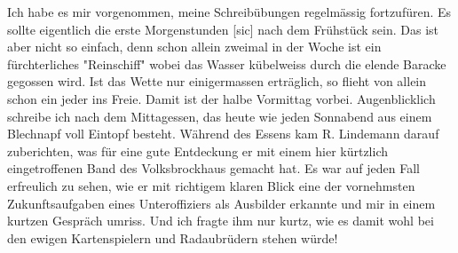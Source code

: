 \def\day{3. Oktober 1942 *}
\mktitle

Ich habe es mir vorgenommen, meine Schreib\"{u}bungen regelm\"{a}ssig fortzuf\"{u}ren.
Es sollte eigentlich die erste Morgenstunden{\color{red} [sic] } nach dem Fr\"{u}hst\"{u}ck sein.
Das ist aber nicht so einfach, denn schon allein zweimal in der Woche ist ein f\"{u}rchterliches "Reinschiff" wobei das Wasser k\"{u}belweiss durch die elende Baracke gegossen wird.
Ist das Wette nur einigermassen ertr\"{a}glich, so flieht von allein schon ein jeder ins Freie.
Damit ist der halbe Vormittag vorbei.
Augenblicklich schreibe ich nach dem Mittagessen, das heute wie jeden Sonnabend aus einem Blechnapf voll Eintopf besteht.
W\"{a}hrend des Essens kam R. Lindemann darauf zuberichten, was f\"{u}r eine gute Entdeckung er mit einem hier k\"{u}rtzlich eingetroffenen Band des Volksbrockhaus gemacht hat.
Es war auf jeden Fall erfreulich zu sehen, wie er mit richtigem klaren Blick eine der vornehmsten Zukunftsaufgaben eines Unteroffiziers als Ausbilder erkannte und mir in einem kurtzen Gespr\"{a}ch umriss.
Und ich fragte ihm nur kurtz, wie es damit wohl bei den ewigen Kartenspielern und Radaubr\"{u}dern stehen w\"{u}rde!

\clearpage
